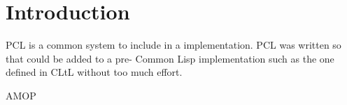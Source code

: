 \section{Introduction}

PCL \cite{Bobrow:1986:CML:28697.28700} is a common system to include
in a \cl{} implementation.  PCL was written so that \clos{} could be
added to a pre-\clos{} Common Lisp implementation such as the one
defined in CLtL \cite{Steele:1984:CLL} without too much effort.  

AMOP \cite{Kiczales:1991:AMP:574212}
